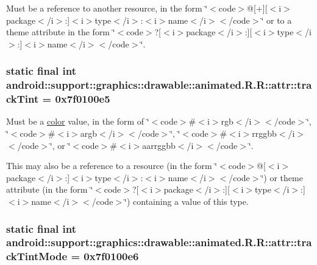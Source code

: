 Must be a reference to another resource, in the form \char`\"{}$<$code$>$@\mbox{[}+\mbox{]}\mbox{[}$<$i$>$package$<$/i$>$:\mbox{]}$<$i$>$type$<$/i$>$:$<$i$>$name$<$/i$>$$<$/code$>$\char`\"{} or to a theme attribute in the form \char`\"{}$<$code$>$?\mbox{[}$<$i$>$package$<$/i$>$:\mbox{]}\mbox{[}$<$i$>$type$<$/i$>$:\mbox{]}$<$i$>$name$<$/i$>$$<$/code$>$\char`\"{}. \hypertarget{classandroid_1_1support_1_1graphics_1_1drawable_1_1animated_1_1_r_1_1attr_8f2494b5a04238a21e6062fc0ab5b72b}{
\subsubsection[{trackTint}]{\setlength{\rightskip}{0pt plus 5cm}static final int android::support::graphics::drawable::animated.R.R::attr::trackTint = 0x7f0100e5}}
\label{classandroid_1_1support_1_1graphics_1_1drawable_1_1animated_1_1_r_1_1attr_8f2494b5a04238a21e6062fc0ab5b72b}


Must be a \hyperlink{classandroid_1_1support_1_1graphics_1_1drawable_1_1animated_1_1_r_1_1color}{color} value, in the form of \char`\"{}$<$code$>$\#$<$i$>$rgb$<$/i$>$$<$/code$>$\char`\"{}, \char`\"{}$<$code$>$\#$<$i$>$argb$<$/i$>$$<$/code$>$\char`\"{}, \char`\"{}$<$code$>$\#$<$i$>$rrggbb$<$/i$>$$<$/code$>$\char`\"{}, or \char`\"{}$<$code$>$\#$<$i$>$aarrggbb$<$/i$>$$<$/code$>$\char`\"{}. 

This may also be a reference to a resource (in the form \char`\"{}$<$code$>$@\mbox{[}$<$i$>$package$<$/i$>$:\mbox{]}$<$i$>$type$<$/i$>$:$<$i$>$name$<$/i$>$$<$/code$>$\char`\"{}) or theme attribute (in the form \char`\"{}$<$code$>$?\mbox{[}$<$i$>$package$<$/i$>$:\mbox{]}\mbox{[}$<$i$>$type$<$/i$>$:\mbox{]}$<$i$>$name$<$/i$>$$<$/code$>$\char`\"{}) containing a value of this type. \hypertarget{classandroid_1_1support_1_1graphics_1_1drawable_1_1animated_1_1_r_1_1attr_40fccd28d0ddfd2c80868c87e83c655e}{
\subsubsection[{trackTintMode}]{\setlength{\rightskip}{0pt plus 5cm}static final int android::support::graphics::drawable::animated.R.R::attr::trackTintMode = 0x7f0100e6}}
\label{classandroid_1_1support_1_1graphics_1_1drawable_1_1animated_1_1_r_1_1attr_40fccd28d0ddfd2c80868c87e83c655e}



